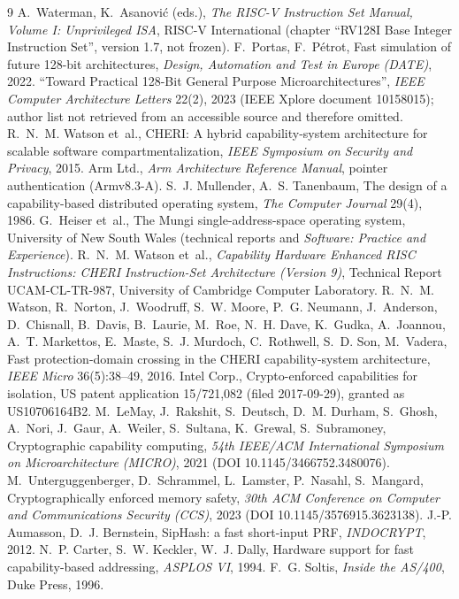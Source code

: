 \documentclass[10pt,a4paper]{article}
\begin{document}
\begin{thebibliography}{9}
 A.~Waterman, K.~Asanovi\'c (eds.), \emph{The RISC-V Instruction Set Manual, Volume I: Unprivileged ISA}, RISC-V International (chapter ``RV128I Base Integer Instruction Set'', version 1.7, not frozen).
 F.~Portas, F.~P\'etrot, Fast simulation of future 128-bit architectures, \emph{Design, Automation and Test in Europe (DATE)}, 2022.
 ``Toward Practical 128-Bit General Purpose Microarchitectures'', \emph{IEEE Computer Architecture Letters} 22(2), 2023 (IEEE Xplore document 10158015); author list not retrieved from an accessible source and therefore omitted.
 R.~N.~M. Watson et~al., CHERI: A hybrid capability-system architecture for scalable software compartmentalization, \emph{IEEE Symposium on Security and Privacy}, 2015.
 Arm Ltd., \emph{Arm Architecture Reference Manual}, pointer authentication (Armv8.3-A).
 S.~J. Mullender, A.~S. Tanenbaum, The design of a capability-based distributed operating system, \emph{The Computer Journal} 29(4), 1986.
 G.~Heiser et~al., The Mungi single-address-space operating system, University of New South Wales (technical reports and \emph{Software: Practice and Experience}).
 R.~N.~M. Watson et~al., \emph{Capability Hardware Enhanced RISC Instructions: CHERI Instruction-Set Architecture (Version 9)}, Technical Report UCAM-CL-TR-987, University of Cambridge Computer Laboratory.
 R.~N.~M. Watson, R.~Norton, J.~Woodruff, S.~W. Moore, P.~G. Neumann, J.~Anderson, D.~Chisnall, B.~Davis, B.~Laurie, M.~Roe, N.~H. Dave, K.~Gudka, A.~Joannou, A.~T. Markettos, E.~Maste, S.~J. Murdoch, C.~Rothwell, S.~D. Son, M.~Vadera, Fast protection-domain crossing in the CHERI capability-system architecture, \emph{IEEE Micro} 36(5):38--49, 2016.
 Intel Corp., Crypto-enforced capabilities for isolation, US patent application 15/721,082 (filed 2017-09-29), granted as US10706164B2.
 M.~LeMay, J.~Rakshit, S.~Deutsch, D.~M. Durham, S.~Ghosh, A.~Nori, J.~Gaur, A.~Weiler, S.~Sultana, K.~Grewal, S.~Subramoney, Cryptographic capability computing, \emph{54th IEEE/ACM International Symposium on Microarchitecture (MICRO)}, 2021 (DOI 10.1145/3466752.3480076).
 M.~Unterguggenberger, D.~Schrammel, L.~Lamster, P.~Nasahl, S.~Mangard, Cryptographically enforced memory safety, \emph{30th ACM Conference on Computer and Communications Security (CCS)}, 2023 (DOI 10.1145/3576915.3623138).
 J.-P. Aumasson, D.~J. Bernstein, SipHash: a fast short-input PRF, \emph{INDOCRYPT}, 2012.
 N.~P. Carter, S.~W. Keckler, W.~J. Dally, Hardware support for fast capability-based addressing, \emph{ASPLOS VI}, 1994.
 F.~G. Soltis, \emph{Inside the AS/400}, Duke Press, 1996.
\end{thebibliography}
\end{document}
